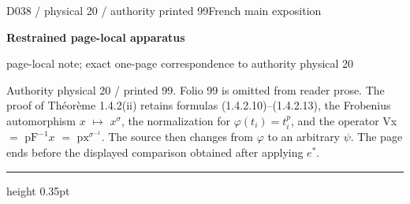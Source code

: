\documentclass[9pt]{article}
\newcommand{\CanonText}[1]{\par{\fontsize{8.0}{9.35}\selectfont\RaggedRight #1\par}\vspace{2.2pt}}
\newcommand{\LayerTitle}{Restrained page-local apparatus}
\begin{document}
\noindent\begin{minipage}[t][\dimexpr\textheight-5pt\relax][t]{\textwidth}
{\sffamily\fontsize{7.3}{8.2}\selectfont\color{Quiet} D038 / physical 20 / authority printed 99\hfill French main exposition}
\par{}\vspace{4.5pt}
{\sffamily\fontsize{10.4}{11.6}\selectfont\bfseries\color{Accent} \LayerTitle}
\par{\sffamily\fontsize{6.7}{7.7}\selectfont\color{Quiet} page-local note; exact one-page correspondence to authority physical 20}
\vspace{5pt}
\CanonText{Authority physical 20 / printed 99. Folio 99 is omitted from reader prose. The proof of Théorème 1.4.2(ii) retains formulas (1.4.2.10)–(1.4.2.13), the Frobenius automorphism \(x\) \(\mapsto{}\) \(x^\sigma{}\), the normalization for \(\varphi{}(t_{i})=t_{i}^{p}\), and the operator Vx \(=\) \(\text{pF}^{-1}x\) \(=\) \(\text{px}^{\sigma{}^{-1}}\). The source then changes from \(\varphi{}\) to an arbitrary \(\psi{}\). The page ends before the displayed comparison obtained after applying \(e^{*}\).}
\vfill
{\color{Accent}\hrule height 0.35pt}\vspace{3pt}
\end{minipage}
\newpage
\end{document}
